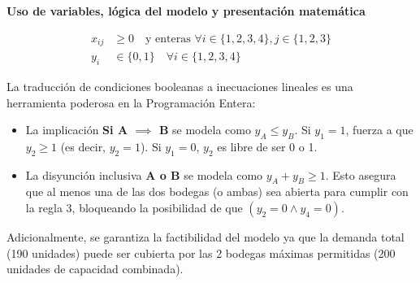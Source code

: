 \documentclass[10pt,a4paper]{article}
\begin{document}
\vspace{3mm}
\textbf{Uso de variables, lógica del modelo y presentación matemática}

\begin{align*}
    x_{ij} &\ge 0 \quad \text{y enteras } \forall i \in \{1, 2, 3, 4\}, j \in \{1, 2, 3\} \\
    y_i &\in \{0, 1\} \quad \forall i \in \{1, 2, 3, 4\}
\end{align*}

\begin{nota}{}
La traducción de condiciones booleanas a inecuaciones lineales es una herramienta poderosa en la Programación Entera:
\begin{itemize}
    \item La implicación \textbf{Si A $\implies$ B} se modela como $y_A \le y_B$. Si $y_1 = 1$, fuerza a que $y_2 \ge 1$ (es decir, $y_2 = 1$). Si $y_1 = 0$, $y_2$ es libre de ser 0 o 1.
    \item La disyunción inclusiva \textbf{A o B} se modela como $y_A + y_B \ge 1$. Esto asegura que al menos una de las dos bodegas (o ambas) sea abierta para cumplir con la regla 3, bloqueando la posibilidad de que $(y_2 = 0 \land y_4 = 0)$.
\end{itemize}
Adicionalmente, se garantiza la factibilidad del modelo ya que la demanda total (190 unidades) puede ser cubierta por las 2 bodegas máximas permitidas (200 unidades de capacidad combinada).
\end{nota}


\newpage
\end{document}
